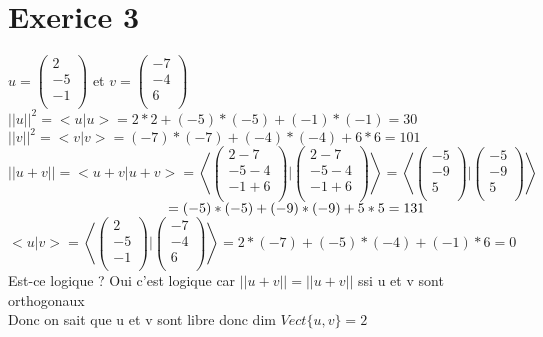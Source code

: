 \documentclass{article}
\author{Frederic Becerril}
\newcommand\tab[1][1cm]{\hspace*{#1}}
\begin{document}
\part*{Exerice 3}

$u = \begin{pmatrix}
    2\\
    -5\\
    -1\\
\end{pmatrix}$ et $v = \begin{pmatrix}
    -7\\
    -4\\
    6\\
\end{pmatrix}$\\
$||u||^2 = <u|u> = 2 * 2 + (-5) * (-5) + (-1) * (-1) = 30$\\
$||v||^2 = <v|v> = (-7) * (-7) + (-4) * (-4) + 6 * 6 = 101$\\
$||u + v|| = <u + v| u + v> = \left<
    \begin{pmatrix}
        2 - 7\\
        -5 - 4\\
        -1 + 6\\
    \end{pmatrix} | \begin{pmatrix}
        2 - 7\\
        -5 - 4\\
        -1 + 6\\
    \end{pmatrix}
\right> =  \left<
    \begin{pmatrix}
        -5\\
        -9\\
        5\\
    \end{pmatrix} | \begin{pmatrix}
        -5\\
        -9\\
        5\\
    \end{pmatrix}
\right>$\\
$\tab[4cm] = (-5) * (-5) + (-9) * (-9) + 5 * 5 = 131$\\
$<u|v> = \left<
    \begin{pmatrix}
        2\\
        -5\\
        -1\\
    \end{pmatrix} | \begin{pmatrix}
        -7\\
        -4\\
        6\\
    \end{pmatrix}
\right> = 2 * (-7) + (-5) * (-4) + (-1) * 6 = 0$\\
Est-ce logique ? Oui c'est logique car $||u + v|| = ||u + v||$ ssi u et v sont orthogonaux\\
Donc on sait que u et v sont libre donc dim $Vect \{u, v\} = 2$
\end{document}
